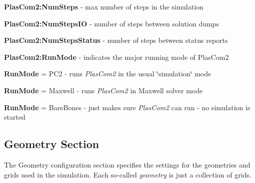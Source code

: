 \begin{DoxyItemize}
\item {\bfseries Plas\+Com2\+:Num\+Steps} -\/ max number of steps in the simulation
\item {\bfseries Plas\+Com2\+:Num\+Steps\+IO} -\/ number of steps between solution dumps
\item {\bfseries Plas\+Com2\+:Num\+Steps\+Status} -\/ number of steps between status reports
\item {\bfseries Plas\+Com2\+:Run\+Mode} -\/ indicates the major running mode of Plas\+Com2
\begin{DoxyItemize}
\item {\bfseries Run\+Mode} = P\+C2 -\/ runs {\itshape Plas\+Com2} in the usual \char`\"{}simulation\char`\"{} mode
\item {\bfseries Run\+Mode} = Maxwell -\/ runs {\itshape Plas\+Com2} in Maxwell solver mode
\item {\bfseries Run\+Mode} = Bare\+Bones -\/ just makes sure {\itshape Plas\+Com2} can run -\/ no simulation is started
\end{DoxyItemize}
\end{DoxyItemize}\hypertarget{user_reference_configgeometry}{}\subsection{Geometry Section}\label{user_reference_configgeometry}
The Geometry configuration section specifies the settings for the geometries and grids used in the simulation. Each so-\/called {\itshape geometry} is just a collection of grids.


